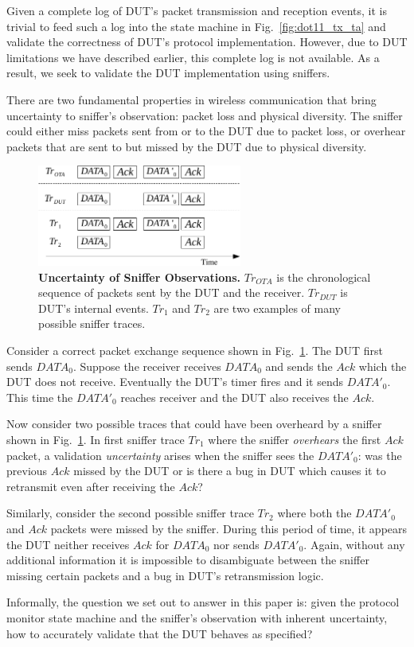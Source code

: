 Given a complete log of DUT's packet transmission and reception events, it is
trivial to feed such a log into the state machine in Fig.~\ref{fig:dot11_tx_ta}
and validate the correctness of DUT's protocol implementation. However, due to
DUT limitations we have described earlier, this complete log is not
available. As a result, we seek to validate the DUT implementation using
sniffers.

There are two fundamental properties in wireless communication that bring uncertainty to
sniffer's observation: packet loss and physical diversity. The sniffer could
either miss packets sent from or to the DUT due to packet loss, or overhear packets
that are sent to but missed by the DUT due to physical diversity.

\begin{figure}[t!]
  \centering
  \includegraphics[width=0.6\textwidth]{./figures/false_pos.pdf}
  \caption{\textbf{Uncertainty of Sniffer Observations.} $Tr_{OTA}$ is
    the chronological sequence of packets sent by the DUT and the receiver.
    $Tr_{DUT}$ is DUT's internal events. $Tr_1$ and $Tr_2$ are two examples of
    many possible sniffer traces.}
  \label{fig:sniffer_in_middle}
\end{figure}

Consider a correct packet exchange sequence shown in
Fig.~\ref{fig:sniffer_in_middle}. The DUT first sends $DATA_0$.  Suppose the
receiver receives $DATA_0$ and sends the $Ack$ which the DUT does not receive.
Eventually the DUT's timer fires and it sends $DATA'_0$.  This time the
$DATA'_0$ reaches receiver and the DUT also receives the $Ack$.

Now consider two possible traces that could have been overheard by a sniffer shown
in Fig.~\ref{fig:sniffer_in_middle}.
In first sniffer trace $Tr_1$ where the sniffer
\textit{overhears} the first $Ack$ packet, a validation \textit{uncertainty}
arises when the sniffer sees the $DATA'_0$: was the previous $Ack$ missed by the
DUT or is there a bug in DUT which causes it to retransmit even after receiving
the $Ack$?

Similarly, consider the second possible sniffer trace $Tr_2$
where both the $DATA'_0$ and $Ack$ packets were missed by the sniffer. During
this period of time, it appears the DUT neither receives $Ack$ for $DATA_0$ nor
sends $DATA'_0$. Again, without any additional information it is impossible to
disambiguate between the sniffer missing certain packets and a bug in DUT's
retransmission logic.

Informally, the question we set out to answer in this paper is: given the
protocol monitor state machine and the sniffer's observation with inherent
uncertainty, how to accurately validate that the DUT behaves as specified?
